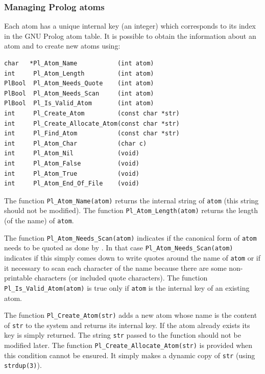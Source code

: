 \subsubsection{Managing Prolog atoms}

Each atom has a unique internal key (an integer) which corresponds to its index in the
GNU Prolog atom table. It is possible to obtain the information about an atom
and to create new atoms using:

\begin{Code}
\begin{verbatim}
char   *Pl_Atom_Name           (int atom)
int     Pl_Atom_Length         (int atom)
PlBool  Pl_Atom_Needs_Quote    (int atom)
PlBool  Pl_Atom_Needs_Scan     (int atom)
PlBool  Pl_Is_Valid_Atom       (int atom)
int     Pl_Create_Atom         (const char *str)
int     Pl_Create_Allocate_Atom(const char *str)
int     Pl_Find_Atom           (const char *str)
int     Pl_Atom_Char           (char c)
int     Pl_Atom_Nil            (void)
int     Pl_Atom_False          (void)
int     Pl_Atom_True           (void)
int     Pl_Atom_End_Of_File    (void)
\end{verbatim}
\end{Code}

The function \texttt{Pl\_Atom\_Name(atom)} returns the internal string of
\texttt{atom} (this string should not be modified). The function
\texttt{Pl\_Atom\_Length(atom)} returns the length (of the name) of
\texttt{atom}.

The function \texttt{Pl\_Atom\_Needs\_Scan(atom)} indicates if the canonical
form of \texttt{atom} needs to be quoted as done by 
. In that case \texttt{Pl\_Atom\_Needs\_Scan(atom)}
indicates if this simply comes down to write quotes around the name of
\texttt{atom} or if it necessary to scan each character of the name because
there are some non-printable characters (or included quote characters). The
function \texttt{Pl\_Is\_Valid\_Atom(atom)} is true only if \texttt{atom} is the
internal key of an existing atom.

The function \texttt{Pl\_Create\_Atom(str)} adds a new atom whose name is the
content of \texttt{str} to the system and returns its internal key. If the
atom already exists its key is simply returned. The string \texttt{str}
passed to the function should not be modified later. The function
\texttt{Pl\_Create\_Allocate\_Atom(str)} is provided when this condition cannot
be ensured. It simply makes a dynamic copy of \texttt{str}
(using \texttt{strdup(3)}).

